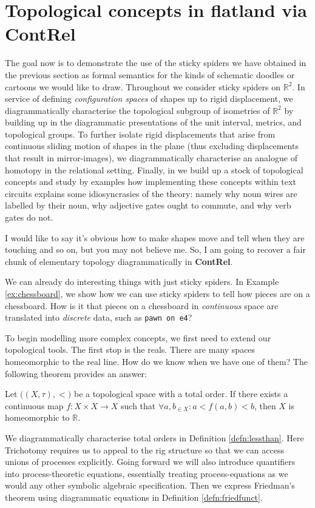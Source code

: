 \section{Topological concepts in flatland via \textbf{ContRel}}\label{sec:concepts}

The goal now is to demonstrate the use of the sticky spiders we have obtained in the previous section as formal semantics for the kinds of schematic doodles or cartoons we would like to draw. Throughout we consider sticky spiders on $\mathbb{R}^2$. In service of defining \emph{configuration spaces} of shapes up to rigid displacement, we diagrammatically characterise the topological subgroup of isometries of $\mathbb{R}^2$ by building up in the diagrammatic presentations of the unit interval, metrics, and topological groups. To further isolate rigid displacements that arise from continuous sliding motion of shapes in the plane (thus excluding displacements that result in mirror-images), we diagrammatically characterise an analogue of homotopy in the relational setting. Finally, in we build up a stock of topological concepts and study by examples how implementing these concepts within text circuits explains some idiosyncrasies of the theory: namely why noun wires are labelled by their noun, why adjective gates ought to commute, and why verb gates do not.

 I would like to say it's obvious how to make shapes move and tell when they are touching and so on, but you may not believe me. So, I am going to recover a fair chunk of elementary topology diagrammatically in \textbf{ContRel}.

 We can already do interesting things with just sticky spiders. In Example \ref{ex:chessboard}, we show how we can use sticky spiders to tell how pieces are on a chessboard. How is it that pieces on a chessboard in \emph{continuous} space are translated into \emph{discrete} data, such as \texttt{pawn on e4}?

To begin modelling more complex concepts, we first need to extend our topological tools. The first stop is the reals. There are many spaces homeomorphic to the real line. How do we know when we have one of them? The following theorem provides an answer:
\begin{theorem}[Friedman]\label{thm:Friedman}
Let $\big((X,\tau), < \big)$ be a topological space with a total order. If there exists a continuous map $f: X \times X \rightarrow X$ such that $\forall a,b_{\in X} : a < f(a,b) < b$, then $X$ is homeomorphic to $\mathbb{R}$. \citep{friedman_fom_2005}
\end{theorem}
We diagrammatically characterise total orders in Definition \ref{defn:lessthan}. Here Trichotomy requires us to appeal to the rig structure so that we can access unions of processes explicitly. Going forward we will also introduce quantifiers into process-theoretic equations, essentially treating process-equations as we would any other symbolic algebraic specification. Then we express Friedman's theorem using diagrammatic equations in Definition \ref{defn:friedfunct}.

